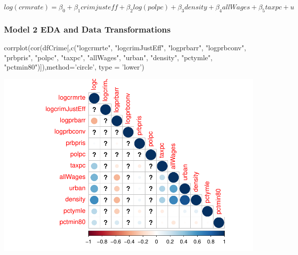 \documentclass[]{article}
\newenvironment{Shaded}{}{}
\newcommand{\DataTypeTok}[1]{#1}
\newcommand{\KeywordTok}[1]{\textcolor[rgb]{0.00,0.00,1.00}{#1}}
\newcommand{\NormalTok}[1]{#1}
\newcommand{\StringTok}[1]{\textcolor[rgb]{0.00,0.50,0.50}{#1}}
\begin{document}
\[log(crmrate) = \beta_0 + \beta_1crimjusteff + \beta_2log(polpc) + \beta_3density + \beta_4allWages + \beta_5taxpc + u\]

\hypertarget{model-2-eda-and-data-transformations}{%
\subsubsection{Model 2 EDA and Data
Transformations}\label{model-2-eda-and-data-transformations}}

\begin{Shaded}
\begin{Highlighting}[]
\KeywordTok{corrplot}\NormalTok{(}\KeywordTok{cor}\NormalTok{(dfCrime[,}\KeywordTok{c}\NormalTok{(}\StringTok{"logcrmrte"}\NormalTok{, }\StringTok{"logcrimJustEff"}\NormalTok{, }\StringTok{"logprbarr"}\NormalTok{, }\StringTok{"logprbconv"}\NormalTok{, }
                        \StringTok{"prbpris"}\NormalTok{, }\StringTok{"polpc"}\NormalTok{, }\StringTok{"taxpc"}\NormalTok{, }\StringTok{"allWages"}\NormalTok{, }\StringTok{"urban"}\NormalTok{, }\StringTok{"density"}\NormalTok{,}
                        \StringTok{"pctymle"}\NormalTok{, }\StringTok{"pctmin80"}\NormalTok{)]),}\DataTypeTok{method=}\StringTok{'circle'}\NormalTok{, }\DataTypeTok{type =} \StringTok{'lower'}\NormalTok{)}
\end{Highlighting}
\end{Shaded}

\includegraphics{Bagnard_Gaustad_Hartman_Leung_Lab_3_files/figure-latex/unnamed-chunk-81-1.pdf}
\end{document}

